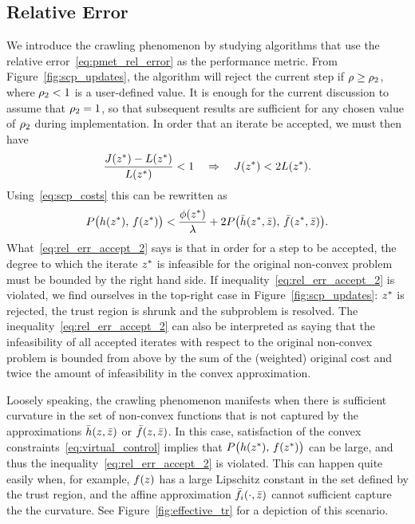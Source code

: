 \documentclass[letterpaper, 10 pt, conference]{ieeeconf}
\begin{document}
\subsection{Relative Error}\label{subsec:creep_rel_err}

We introduce the crawling phenomenon by studying algorithms that use the relative error~\eqref{eq:pmet_rel_error} as the performance metric. From Figure~\ref{fig:scp_updates}, the algorithm will reject the current step if $\rho\geq\rho_2$, where $\rho_2<1$ is a user-defined value. It is enough for the current discussion to assume that $\rho_2=1$, so that subsequent results are sufficient for any chosen value of $\rho_2$ during implementation. In order that an iterate be accepted, we must then have
\begin{equation}
\frac{J(z^*) - L(z^*)}{L(z^*)} < 1 \quad \Rightarrow \quad  J(z^*) < 2 L(z^*).
\label{eq:rel_err_accept}
\end{equation} 
Using~\eqref{eq:scp_costs} this can be rewritten as
\begin{equation}
P\big( h(z^*),\,f(z^*) \big) < \frac{\phi(z^*)}{\lambda} + 2 P\big( \bar{h}(z^*,\bar{z}),\,\bar{f}(z^*,\bar{z}) \big).
\label{eq:rel_err_accept_2}
\end{equation}
What~\eqref{eq:rel_err_accept_2} says is that in order for a step to be accepted, the degree to which the iterate $z^*$ is infeasible for the original non-convex problem must be bounded by the right hand side. If inequality~\eqref{eq:rel_err_accept_2} is violated, we find ourselves in the top-right case in Figure~\ref{fig:scp_updates}: $z^*$ is rejected, the trust region is shrunk and the subproblem is resolved. The inequality~\eqref{eq:rel_err_accept_2} can also be interpreted as saying that the infeasibility of all accepted iterates with respect to the original non-convex problem is bounded from above by the sum of the (weighted) original cost and twice the amount of infeasibility in the convex approximation. 

Loosely speaking, the crawling phenomenon manifests when there is sufficient curvature in the set of non-convex functions that is not captured by the approximations $\bar{h}(z,\bar{z})$ or $\bar{f}(z,\bar{z})$. In this case, satisfaction of the convex constraints~\eqref{eq:virtual_control} implies that $P\big(h(z^*),\,f(z^*)\big)$ can be large, and thus the inequality~\eqref{eq:rel_err_accept_2} is violated. This can happen quite easily when, for example, $f(z)$ has a large Lipschitz constant in the set defined by the trust region, and the affine approximation $\bar{f}_i(\cdot,\bar{z})$ cannot sufficient capture the the curvature. See Figure~\ref{fig:effective_tr} for a depiction of this scenario.
\end{document}
